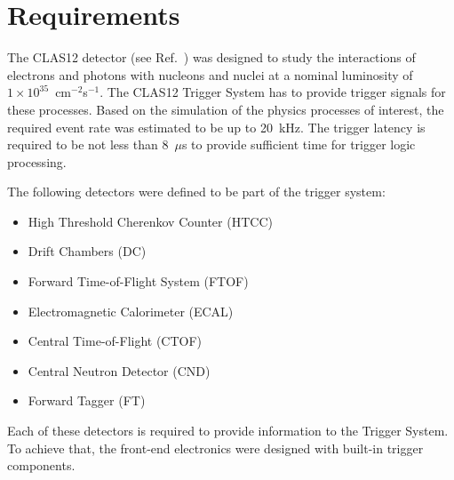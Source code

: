 \section{Requirements}

The CLAS12 detector (see Ref.~\cite{overview-ref}) was designed to study the interactions of electrons
and photons with nucleons and nuclei at a nominal luminosity of $1\times 10^{35}$~cm$^{-2}$s$^{-1}$. The
CLAS12 Trigger System has to provide trigger signals for these processes. Based on the simulation of the
physics processes of interest, the required event rate was estimated to be up to 20~kHz. The trigger latency
is required to be not less than 8~$\mu$s to provide sufficient time for trigger logic processing.

The following detectors were defined to be part of the trigger system:

\begin{itemize}
	\item High Threshold Cherenkov Counter (HTCC)~\cite{htcc-ref}
	\item Drift Chambers (DC)~\cite{dc-ref}
	\item Forward Time-of-Flight System (FTOF)~\cite{ftof-ref}
	\item Electromagnetic Calorimeter (ECAL)~\cite{ec-ref}
	\item Central Time-of-Flight (CTOF)~\cite{ctof-ref}
	\item Central Neutron Detector (CND)~\cite{cnd-ref}
	\item Forward Tagger (FT)~\cite{ft-ref}
\end{itemize}

Each of these detectors is required to provide information to the Trigger System. To achieve that, the
front-end electronics were designed with built-in trigger components. 

 
